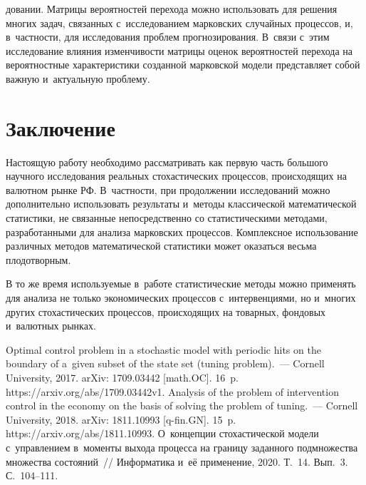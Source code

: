 \begin{multicols}{2}
\noindent
довании. Матрицы вероятностей перехода можно использовать для 
решения многих задач, связанных с~исследованием марковских случайных 
процессов, и, в~частности, для исследования проблем прогнозирования. 
В~связи с~этим исследование влияния изменчивости матрицы оценок 
вероятностей перехода на вероятностные характеристики созданной 
марковской модели представляет собой важную и~актуальную проблему. 



\vspace*{-9pt}

\section{Заключение}

\vspace*{-2pt}

  Настоящую работу необходимо рассматривать как первую часть большого 
научного исследования реальных стохастических процессов, происходящих на 
валютном рынке РФ. В~част\-ности, при продолжении исследований можно 
дополнительно использовать результаты и~методы классической 
математической статистики, не связанные непосредственно со статистическими 
методами, разработанными для анализа марковских процессов. Комплексное 
использование различных методов математической статистики может оказаться 
весьма плодотворным.
  
  В то же время используемые в~работе статистические методы можно 
применять для анализа не только экономических процессов с~интервенциями, 
но и~многих других стохастических процессов, происходящих на товарных, 
фондовых и~валютных рынках.

\vspace*{-9pt}
  
{\small\frenchspacing
 {%
 \begin{thebibliography}{9}
 
 \vspace*{-2pt}
 
   Optimal control problem in a stochastic model with periodic hits on the 
boundary of a~given subset of the state set (tuning problem).~---  Cornell 
University, 2017. arXiv: 1709.03442 [math.OC]. 16~p.  {\sf 
https://arxiv.\linebreak org/abs/1709.03442v1}.
   Analysis of the problem of intervention control in the 
economy on the basis of solving the problem of tuning.~--- Cornell University, 2018. arXiv: 1811.10993 [q-fin.GN]. 15~p. 
{\sf 
https://arxiv.\linebreak org/abs/1811.10993}.
    О~концепции стохастической модели 
   с~управлением 
в~моменты выхода процесса на границу заданного подмножества множества состояний~// 
Информатика и~её применение, 2020. Т.~14. Вып.~3. С.~104--111.


\end{thebibliography}}}
\end{multicols}
